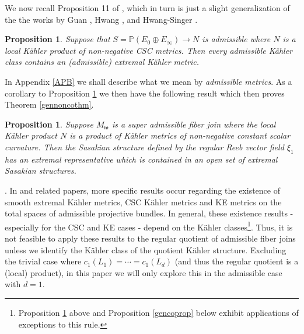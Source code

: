 \documentclass[12pt]{amsart}
\newtheorem{proposition}[theorem]{Proposition}
\newenvironment{remark}{\medskip \refstepcounter{theorem}
\noindent  {\bf Remark \thetheorem}.\rm}{\,}
\renewcommand{\thetheorem}{\thesection.\arabic{theorem}}
\def\bbp{{\mathbb P}}
\def\gw{{\mathfrak w}}
\begin{document}
We now recall Proposition 11 of \cite{ACGT08}, which in turn is just a slight generalization of the the works by Guan \cite{Gua95}, Hwang \cite{Hwa94}, and Hwang-Singer \cite{HwaSi02}.

\begin{proposition} \cite{ACGT08} \label{acgtpr11}
Suppose that $S=\bbp(E_0 \oplus E_\infty) \rightarrow N$ is admissible where
$N$ is a local K\"ahler product of non-negative CSC metrics. Then every admissible
K\"ahler class contains an (admissible) extremal K\"ahler metric.
\end{proposition}

In Appendix \ref{APB} we shall describe what we mean by {\em admissible metrics}.
As a corollary to Proposition \ref{acgtpr11} we then have the following result which then proves Theorem \ref{gennoncothm}.

\begin{proposition}\label{gennonco}
Suppose $M_\gw$ is a super admissible fiber join where the local K\"ahler product $N$ is a product of K\"ahler metrics of non-negative constant scalar curvature. Then the Sasakian structure defined by the regular Reeb vector field $\xi_1$ has an extremal representative which is contained in an open set of extremal Sasakian structures.
\end{proposition}

\begin{remark}
In \cite{ACGT08} and related papers, more specific results occur regarding the existence of smooth extremal K\"ahler metrics, CSC K\"ahler metrics and KE metrics on the total spaces of admissible projective bundles. In general, these existence results - especially for the CSC and KE cases - depend on the K\"ahler classes\footnote{Proposition \ref{gennonco} above and Proposition \ref{gencoprop} below exhibit applications of exceptions to this rule.}. Thus, it is not feasible to apply these results to the regular quotient of admissible fiber joins unless we identify the K\"ahler class of the quotient K\"ahler structure. Excluding the trivial case where $c_1(L_1)=\cdots = c_1(L_d)$ (and thus the regular quotient is a (local) product), in this paper we will only explore this in the admissible case with $d=1$.
\end{remark}
\end{document}
